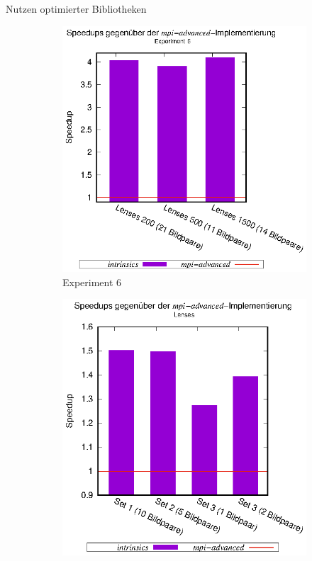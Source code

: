 \begin{frame}{Nutzen optimierter Bibliotheken}
	\begin{figure}[h]
		\begin{subfigure}[b]{0.47\textwidth}
			\centering
			\includegraphics[width=\textwidth]{pdf/speedups_intrinsics_exp6}
			\caption{Experiment 6}
		\end{subfigure}
		\hfill
		\begin{subfigure}[b]{0.47\textwidth}
			\centering
			\includegraphics[width=\textwidth]{pdf/speedups_intrinsics_lenses}

\end{subfigure}
\end{figure}
\end{frame}
